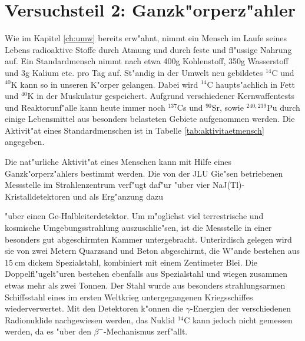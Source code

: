 \documentclass[12pt]{article}
\begin{document}
\section{Versuchsteil 2: Ganzk"orperz"ahler}

Wie im Kapitel \ref{ch:umw} bereits erw"ahnt, nimmt ein Mensch im Laufe seines Lebens radioaktive Stoffe durch Atmung und durch feste und fl"ussige Nahrung auf. Ein Standardmensch nimmt nach \cite{cite4} etwa 400g Kohlenstoff, 350g Wasserstoff und 3g Kalium etc. pro Tag auf. St"andig in der Umwelt neu gebildetes $^{14}$C und $^{40}$K kann so in unseren K"orper gelangen. Dabei wird $^{14}$C haupts"achlich in Fett und $^{40}$K in der Muskulatur gespeichert. Aufgrund verschiedener Kernwaffentests und Reaktorunf"alle kann heute immer noch $^{137}$Cs und $^{90}$Sr, sowie $^{240,239}$Pu durch einige Lebensmittel aus besonders belasteten Gebiete aufgenommen werden. Die Aktivit"at eines Standardmenschen ist in Tabelle \ref{tab:aktivitaetmensch} angegeben.\par 
Die nat"urliche Aktivit"at eines Menschen kann mit Hilfe eines Ganzk"orperz"ahlers bestimmt werden. Die von der JLU Gie"sen betriebenen Messstelle im Strahlenzentrum verf"ugt daf"ur "uber vier NaJ(Tl)-Kristalldetektoren und als Erg"anzung dazu 
\begin{table}[b]
	\centering
	\caption{Auflistung der wichtigsten nat"urlichen Radionuklide im K"orper eines Standardmenschen (Auswahl) \cite{cite4}.}
	\label{tab:aktivitaetmensch}%
\end{table}%
"uber einen Ge-Halbleiterdetektor. Um m"oglichst viel terrestrische und kosmische Umgebungsstrahlung auszuschlie"sen, ist die Messstelle in einer besonders gut abgeschirmten Kammer untergebracht. Unterirdisch gelegen wird sie von zwei Metern Quarzsand und Beton abgeschirmt, die W"ande bestehen aus $\SI{15}{\centi\meter}$ dickem Spezialstahl, kombiniert mit einem Zentimeter Blei. Die Doppelfl"ugelt"uren bestehen ebenfalls aus Spezialstahl und wiegen zusammen etwas mehr als zwei Tonnen. Der Stahl wurde aus besonders strahlungsarmen Schiffsstahl eines im ersten Weltkrieg untergegangenen Kriegsschiffes wiederverwertet. Mit den Detektoren k"onnen die $\gamma$-Energien der verschiedenen Radionuklide nachgewiesen werden, das Nuklid $^{14}$C kann jedoch nicht gemessen werden, da es "uber den $\beta^{-}$-Mechanismus zerf"allt.\par 
\end{document}
